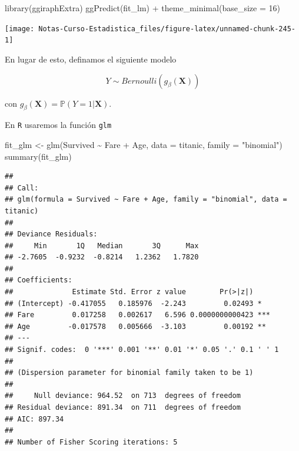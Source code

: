 \documentclass[
  12pt,
]{book}
\newenvironment{Shaded}{\begin{snugshade}}{\end{snugshade}}
\newcommand{\AttributeTok}[1]{\textcolor[rgb]{0.77,0.63,0.00}{#1}}
\newcommand{\DecValTok}[1]{\textcolor[rgb]{0.00,0.00,0.81}{#1}}
\newcommand{\FunctionTok}[1]{\textcolor[rgb]{0.00,0.00,0.00}{#1}}
\newcommand{\NormalTok}[1]{#1}
\newcommand{\OtherTok}[1]{\textcolor[rgb]{0.56,0.35,0.01}{#1}}
\newcommand{\SpecialCharTok}[1]{\textcolor[rgb]{0.00,0.00,0.00}{#1}}
\newcommand{\StringTok}[1]{\textcolor[rgb]{0.31,0.60,0.02}{#1}}
\theoremstyle{definition}
\theoremstyle{definition}
\theoremstyle{definition}
\theoremstyle{remark}
\begin{document}
\begin{Shaded}
\begin{Highlighting}[]
\FunctionTok{library}\NormalTok{(ggiraphExtra)}
\FunctionTok{ggPredict}\NormalTok{(fit\_lm) }\SpecialCharTok{+} \FunctionTok{theme\_minimal}\NormalTok{(}\AttributeTok{base\_size =} \DecValTok{16}\NormalTok{)}
\end{Highlighting}
\end{Shaded}

\begin{center}\texttt{[image: Notas-Curso-Estadistica\_files/figure-latex/unnamed-chunk-245-1]} \end{center}

En lugar de esto, definamos el siguiente modelo

\begin{equation*}
Y \sim Bernoulli (g_{\beta}(\boldsymbol{X})) 
\end{equation*}

con \(g_{\beta}(\boldsymbol{X}) = \mathbb{P}\left(Y=1 \vert \boldsymbol{X}\right)\).

En \texttt{R} usaremos la función \texttt{glm}

\begin{Shaded}
\begin{Highlighting}[]
\NormalTok{fit\_glm }\OtherTok{\textless{}{-}} \FunctionTok{glm}\NormalTok{(Survived }\SpecialCharTok{\textasciitilde{}}\NormalTok{ Fare }\SpecialCharTok{+}\NormalTok{ Age, }\AttributeTok{data =}\NormalTok{ titanic, }
    \AttributeTok{family =} \StringTok{"binomial"}\NormalTok{)}
\FunctionTok{summary}\NormalTok{(fit\_glm)}
\end{Highlighting}
\end{Shaded}

\begin{verbatim}
## 
## Call:
## glm(formula = Survived ~ Fare + Age, family = "binomial", data = titanic)
## 
## Deviance Residuals: 
##     Min       1Q   Median       3Q      Max  
## -2.7605  -0.9232  -0.8214   1.2362   1.7820  
## 
## Coefficients:
##              Estimate Std. Error z value        Pr(>|z|)    
## (Intercept) -0.417055   0.185976  -2.243         0.02493 *  
## Fare         0.017258   0.002617   6.596 0.0000000000423 ***
## Age         -0.017578   0.005666  -3.103         0.00192 ** 
## ---
## Signif. codes:  0 '***' 0.001 '**' 0.01 '*' 0.05 '.' 0.1 ' ' 1
## 
## (Dispersion parameter for binomial family taken to be 1)
## 
##     Null deviance: 964.52  on 713  degrees of freedom
## Residual deviance: 891.34  on 711  degrees of freedom
## AIC: 897.34
## 
## Number of Fisher Scoring iterations: 5
\end{verbatim}
\end{document}
